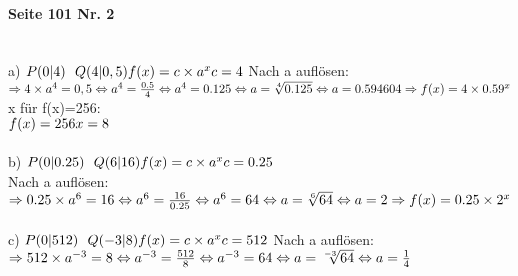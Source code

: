 \documentclass[12pt, a4paper]{report}
\begin{document}
	\paragraph{Seite 101 Nr. 2} \mbox{} \\
	a)
	$\\
	P(0|4)\ \ Q(4|0,5) \\
	f(x) = c \times a^x\\
	c = 4 \\ $
	Nach a auflösen: \\
	$
	\Rightarrow 4 \times a^4 = 0,5 \\
	\Leftrightarrow a^4 = \frac{0.5}{4} \\
	\Leftrightarrow a^4 = 0.125 \\
	\Leftrightarrow a = \sqrt[4]{0.125} \\
	\Leftrightarrow a = 0.594604 \\
	\Rightarrow f(x) = 4 \times 0.59^x
	$ \\
	x für f(x)=256: \\
	$f(x) =256 \\ x = 8$ \\\\
	b)
	$\\
	P(0|0.25)\ \ Q(6|16)\\
	f(x) = c \times a^x \\
	c = 0.25$ \\
	Nach a auflösen: \\
	$
	\Rightarrow 0.25 \times a^6 = 16 \\
	\Leftrightarrow a^6 = \frac{16}{0.25} \\
	\Leftrightarrow a^6 = 64 \\
	\Leftrightarrow a = \sqrt[6]{64} \\
	\Leftrightarrow a = 2
	\Rightarrow f(x) = 0.25 \times 2^x
	$ \\\\
	c)
	$\\
	P(0|512)\ \ Q(-3|8) \\
	f(x) = c \times a^x \\
	c = 512 \\
	$
	Nach a auflösen: \\
	$
	\Rightarrow 512 \times a^{-3} = 8 \\
	\Leftrightarrow a^{-3} = \frac{512}{8} \\
	\Leftrightarrow a^{-3} = 64 \\
	\Leftrightarrow a = \sqrt[-3]{64} \\
	\Leftrightarrow a = \frac{1}{4}
	$

	
	
\end{document}
